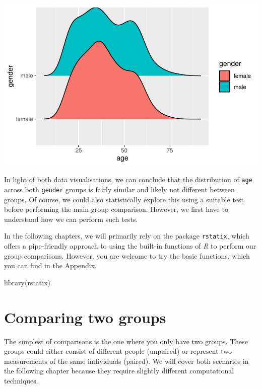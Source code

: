 \documentclass[
  letterpaper,
]{krantz}
\makeatletter
\newenvironment{Shaded}{\begin{snugshade}}{\end{snugshade}}
\newcommand{\FunctionTok}[1]{\textcolor[rgb]{0.28,0.35,0.67}{#1}}
\newcommand{\NormalTok}[1]{\textcolor[rgb]{0.00,0.23,0.31}{#1}}
\newenvironment{kframe}{%
\medskip{}
\setlength{\fboxsep}{.8em}
 \def\at@end@of@kframe{}%
 \ifinner\ifhmode%
  \def\at@end@of@kframe{\end{minipage}}%
  \begin{minipage}{\columnwidth}%
 \fi\fi%
 \def\FrameCommand##1{\hskip\@totalleftmargin \hskip-\fboxsep
 \colorbox{shadecolor}{##1}\hskip-\fboxsep
     \hskip-\linewidth \hskip-\@totalleftmargin \hskip\columnwidth}%
 \MakeFramed {\advance\hsize-\width
   \@totalleftmargin\z@ \linewidth\hsize
   \@setminipage}}%
 {\par\unskip\endMakeFramed%
 \at@end@of@kframe}
\renewenvironment{Shaded}{\begin{kframe}}{\end{kframe}}
\makeatother
\begin{document}
\includegraphics{11_group_comparison_files/figure-pdf/comparability-of-egyptians-plot-1.pdf}

In light of both data visualisations, we can conclude that the
distribution of \texttt{age} across both \texttt{gender} groups is
fairly similar and likely not different between groups. Of course, we
could also statistically explore this using a suitable test before
performing the main group comparison. However, we first have to
understand how we can perform such tests.

In the following chapters, we will primarily rely on the package
\texttt{rstatix}, which offers a pipe-friendly approach to using the
built-in functions of \emph{R} to perform our group comparisons.
However, you are welcome to try the basic functions, which you can find
in the Appendix.

\begin{Shaded}
\begin{Highlighting}[]
\FunctionTok{library}\NormalTok{(rstatix)}
\end{Highlighting}
\end{Shaded}

\section{Comparing two groups}\label{sec-comparing-two-groups}

The simplest of comparisons is the one where you only have two groups.
These groups could either consist of different people (unpaired) or
represent two measurements of the same individuals (paired). We will
cover both scenarios in the following chapter because they require
slightly different computational techniques.
\end{document}
